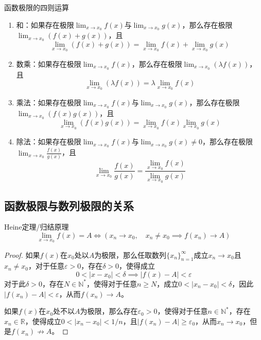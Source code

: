 \documentclass[lang = cn, scheme = chinese, thmcnt = section]{elegantbook}
\newcommand{\N}{\mathbb{N}}            %
\newcommand{\R}{\mathbb{R}}            %
\begin{document}
\begin{proposition}{函数极限的四则运算}
	\begin{enumerate}
		\item 和：如果存在极限$\displaystyle \lim_{x\to x_0}f(x)$与$\displaystyle \lim_{x\to x_0}g(x)$，那么存在极限$\displaystyle \lim_{x\to x_0}(f(x)+g(x))$，且
		$$
		\lim_{x\to x_0}(f(x)+g(x))
		=\lim_{x\to x_0}f(x)+\lim_{x\to x_0}g(x)
		$$
		\item 数乘：如果存在极限$\displaystyle \lim_{x\to x_0}f(x)$，那么存在极限$\displaystyle \lim_{x\to x_0}(\lambda f(x))$，且
		$$
		\lim_{x\to x_0}(\lambda f(x))
		=\lambda \lim_{x\to x_0}f(x)
		$$
		\item 乘法：如果存在极限$\displaystyle \lim_{x\to x_0}f(x)$与$\displaystyle \lim_{x\to x_0}g(x)$，那么存在极限$\displaystyle \lim_{x\to x_0}(f(x)g(x))$，且
		$$
		\lim_{x\to x_0}(f(x)g(x))
		=\lim_{x\to x_0}f(x)\lim_{x\to x_0}g(x)
		$$
		\item 除法：如果存在极限$\displaystyle \lim_{x\to x_0}f(x)$与$\displaystyle \lim_{x\to x_0}g(x)\ne 0$，那么存在极限$\displaystyle \lim_{x\to x_0}\frac{f(x)}{g(x)}$，且
		$$
		\lim_{x\to x_0}\frac{f(x)}{g(x)}
		=\frac{\lim\limits_{x\to x_0}f(x)}{\lim\limits_{x\to x_0}g(x)}
		$$
	\end{enumerate}
\end{proposition}

\subsection{函数极限与数列极限的关系}

\begin{theorem}{Heine定理/归结原理}
	$$
	\lim_{x\to x_0}f(x)=A
	\iff 
	( x_n\to x_0,\quad x_n\ne x_0\implies 
	f(x_n)\to A )
	$$
\end{theorem}

\begin{proof}
	如果$f(x)$在$x_0$处以$A$为极限，那么任取数列$\{x_n\}_{n=1}^{\infty}$成立$x_n\to x_0$且$x_n\ne x_0$，对于任意$\varepsilon>0$，存在$\delta>0$，使得成立
	$$
	0<|x-x_0|<\delta\implies
	|f(x)-A|<\varepsilon
	$$
	对于此$\delta>0$，存在$N\in\N^*$，使得对于任意$n\ge N$，成立$0<|x_n-x_0|<\delta$，因此$|f(x_n)-A|<\varepsilon$，从而$f(x_n)\to A$。
	
	如果$f(x)$在$x_0$处不以$A$为极限，那么存在$\varepsilon_0>0$，使得对于任意$n\in\N^*$，存在$x_n\in\R$，使得成立$0<|x_n-x_0|<1/n$，且$|f(x_n)-A|\ge\varepsilon_0$，从而$x_n\to x_0$，但是$f(x_n)\not\to A$。
\end{proof}
\end{document}
